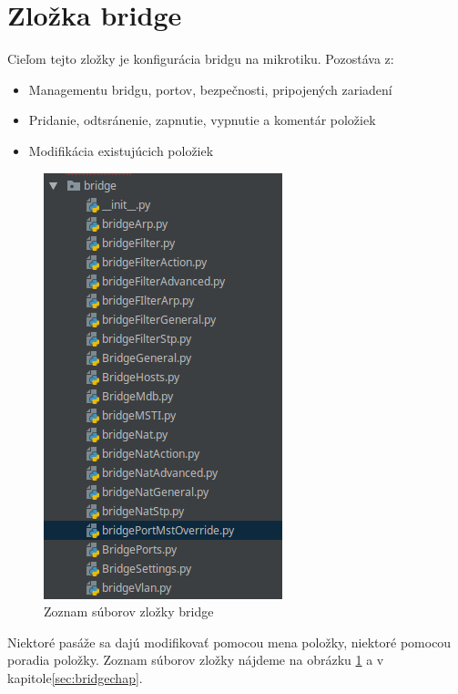 \section{Zložka bridge}
Cieľom tejto zložky je konfigurácia bridgu na mikrotiku. Pozostáva z:\begin{itemize}
\item Managementu bridgu, portov, bezpečnosti, pripojených zariadení
\item Pridanie, odtsránenie, zapnutie, vypnutie a komentár položiek
\item Modifikácia existujúcich položiek
\end{itemize}
\begin{figure}[H]
\centering
\includegraphics[scale=0.57]{../text/bridgeList.png}
\caption{Zoznam súborov zložky bridge}
\label{fig:bridge2}
\end{figure} 
Niektoré pasáže sa dajú modifikovať pomocou mena položky, niektoré pomocou poradia položky. Zoznam súborov  zložky nájdeme na obrázku \ref{fig:bridge2} a v kapitole\ref{sec:bridgechap}. 
